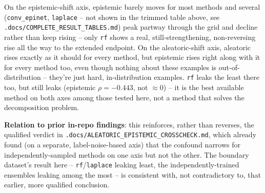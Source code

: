 On the epistemic-shift axis, epistemic barely moves for most methods and
several (\texttt{conv\_epinet}, \texttt{laplace} -- not shown in the trimmed
table above, see \texttt{.docs/COMPLETE\_RESULT\_TABLES.md}) peak partway
through the grid and decline rather than keep rising -- only \texttt{rf}
shows a real, still-strengthening, non-reversing rise all the way to the
extended endpoint. On the aleatoric-shift axis, aleatoric rises exactly as
it should for every method, but epistemic rises right along with it for
every method too, even though nothing about these examples is
out-of-distribution -- they're just hard, in-distribution examples.
\texttt{rf} leaks the least there too, but still leaks (epistemic
$\rho{=}-0.443$, not $\approx 0$) -- it is the best available method on both
axes among those tested here, not a method that solves the decomposition
problem.

\textbf{Relation to prior in-repo findings}: this reinforces, rather than
reverses, the qualified verdict in
\texttt{.docs/ALEATORIC\_EPISTEMIC\_CROSSCHECK.md}, which already found
(on a separate, label-noise-based axis) that the confound narrows for
independently-sampled methods on one axis but not the other. The boundary
dataset's result here -- \texttt{rf}/\texttt{laplace} leaking least, the
independently-trained ensembles leaking among the most -- is consistent
with, not contradictory to, that earlier, more qualified conclusion.
